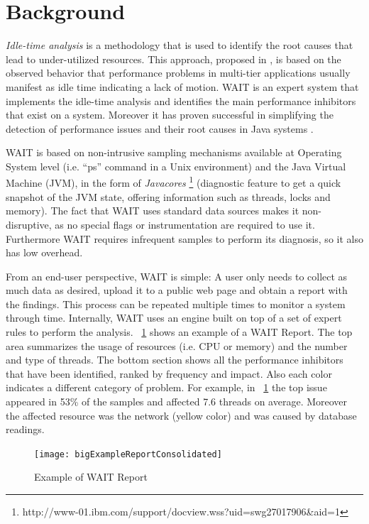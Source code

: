\documentclass[runningheads,a4paper]{llncs}
\begin{document}
\section{Background}
\label{Background}
\vspace{-7pt}
\emph{Idle-time analysis} is a methodology that is used to identify the root
causes that lead to under-utilized resources. This approach, proposed in
\cite{Altman2010}, is based on the observed behavior that performance problems in multi-tier
applications usually manifest as idle time indicating a lack of motion.
WAIT is an expert system that implements the idle-time analysis and identifies
the main performance inhibitors that exist on a system. Moreover it has proven successful in simplifying the detection of performance issues and their root causes in Java
systems \cite{Altman2010,Wu1}.

WAIT is based on non-intrusive sampling mechanisms available at
Operating System level (i.e. ``ps'' command in a Unix environment) and the Java
Virtual Machine (JVM), in the form of \emph{Javacores}
\footnote{http://www-01.ibm.com/support/docview.wss?uid=swg27017906\&aid=1}
(diagnostic feature to get a quick snapshot of the JVM state, offering
information such as threads, locks and memory). The fact that WAIT uses standard
data sources makes it non-disruptive, as no special flags or instrumentation are
required to use it. Furthermore WAIT requires infrequent samples to perform its
diagnosis, so it also has low overhead.

From an end-user perspective, WAIT is simple: A user only needs to
collect as much data as desired, upload it to a public web page and obtain a
report with the findings. This process can be repeated multiple times to monitor a
system through time. Internally, WAIT uses an engine built on top of a set of 
expert rules to perform the analysis. \figurename ~\ref{fig_WAITReport} shows an
example of a WAIT Report. The top area summarizes the usage of resources (i.e.
CPU or memory) and the number and type of threads. The bottom section shows all
the performance inhibitors that have been identified, ranked by frequency and impact. 
Also each color indicates a different category of problem. For example, in
\figurename ~\ref{fig_WAITReport} the top issue appeared in 53\% of the samples
and affected 7.6 threads on average. Moreover the affected resource was the
network (yellow color) and was caused by database readings.

\begin{figure}[!h]
\centering
\texttt{[image: bigExampleReportConsolidated]}
\caption{Example of WAIT Report}
\label{fig_WAITReport}
\end{figure}
\end{document}
